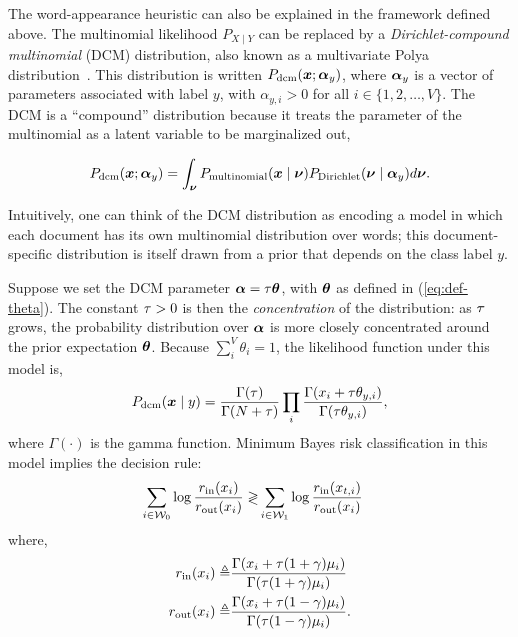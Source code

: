 The word-appearance heuristic can also be explained in the framework defined above. The multinomial likelihood $P_{X \mid Y}$ can be replaced by a \emph{Dirichlet-compound multinomial} (DCM) distribution, also known as a multivariate Polya distribution~\cite{madsen2005modeling}. This distribution is written $P_{\text{dcm}}(\bm{x}; \bm{\alpha}_y)$, where $\bm{\alpha}_y$ is a vector of parameters associated with label $y$, with $\alpha_{y,i} > 0$ for all $i \in \{1, 2, \ldots, V\}$. The DCM is a ``compound'' distribution because it treats the parameter of the multinomial as a latent variable to be marginalized out,
\begin{small}
\begin{equation}
P_{\text{dcm}}(\bm{x}; \bm{\alpha}_y) = \int_{\bm{\nu}} P_{\text{multinomial}}(\bm{x} \mid \bm{\nu}) P_{\text{Dirichlet}}(\bm{\nu} \mid \bm{\alpha}_y) d\bm{\nu}.
\end{equation}
\end{small}
Intuitively, one can think of the DCM distribution as encoding a model in which each document has its own multinomial distribution over words; this document-specific distribution is itself drawn from a prior that depends on the class label $y$.

Suppose we set the DCM parameter $\bm{\alpha} = \tau \bm{\theta}$, with $\bm{\theta}$ as defined in (\ref{eq:def-theta}). The constant $\tau > 0$ is then the \emph{concentration} of the distribution: as $\tau$ grows, the probability distribution over $\bm{\alpha}$ is more closely concentrated around the prior expectation $\bm{\theta}$. Because $\sum^V_i \theta_i = 1$, the likelihood function under this model is,
\begin{equation}
P_{\text{dcm}}(\bm{x} \mid y) = 
\frac{\Gamma(\tau)}{\Gamma(N + \tau)}
\prod_i \frac{\Gamma(x_i + \tau \theta_{y,i})}{\Gamma(\tau \theta_{y,i})},
\end{equation}
where $\Gamma(\cdot)$ is the gamma function. Minimum Bayes risk classification in this model implies the decision rule:
\begin{align}
\sum_{i \in \mathcal{W}_0} \log \frac{r_{\text{in}}(x_{i})}{r_{\text{out}}(x_{i})} \gtrless &
\sum_{i \in \mathcal{W}_1} \log \frac{r_{\text{in}}(x_{t,i})}{r_{\text{out}}(x_{i})}
\label{eq:dcm-rule}
\end{align}
where,
\begin{align}
\label{eq:r-in}
r_{\text{in}}(x_i) \triangleq & 
\frac{\Gamma(x_{i} + \tau (1+\gamma) \mu_i)}
{\Gamma(\tau (1+\gamma) \mu_i)}\\
\label{eq:r-out}
r_{\text{out}}(x_{i}) \triangleq & 
\frac{\Gamma(x_{i} + \tau (1-\gamma) \mu_i)}
{\Gamma(\tau (1-\gamma) \mu_i)}.
\end{align}

